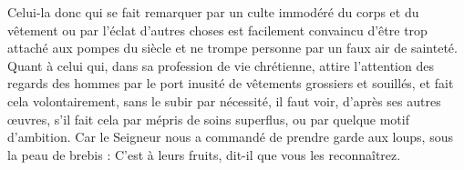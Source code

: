 Celui-la donc qui se fait remarquer par un culte immodéré du corps et du vêtement ou par l’éclat d’autres choses est facilement convaincu d’être trop attaché aux pompes du siècle et ne trompe personne par un faux air de sainteté. Quant à celui qui, dans sa profession de vie chrétienne, attire l’attention des regards des hommes par le port inusité de vêtements grossiers et souillés, et fait cela volontairement, sans le subir par nécessité, il faut voir, d’après ses autres œuvres, s’il fait cela par mépris de soins superflus, ou par quelque motif d’ambition. Car le Seigneur nous a commandé de prendre garde aux loups, sous la peau de brebis : C'est à leurs fruits, dit-il que vous les reconnaîtrez.
